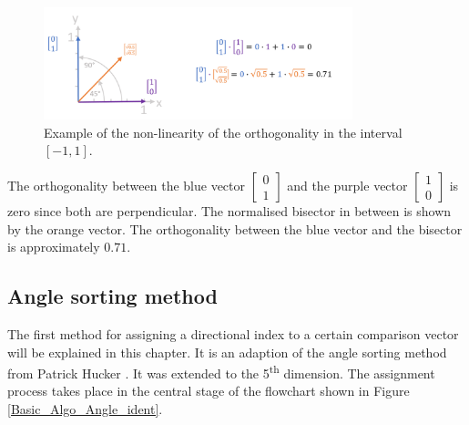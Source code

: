 \begin{figure}[H]
    \centering
    \includegraphics[width=0.8\textwidth]{Graphics/orthogonality2.png}
    \caption{Example of the non-linearity of the orthogonality in the interval $[-1,1]$. }
    \label{orthogonaltiy_figure2}
\end{figure}

The orthogonality between the blue vector $\begin{bmatrix} 0 \\ 1 \end{bmatrix}$ and the purple vector $\begin{bmatrix} 1 \\ 0 \end{bmatrix}$ is zero since both are perpendicular. The normalised bisector in between is shown by the orange vector.
The orthogonality between the blue vector and the bisector is approximately $0.71$.





\subsection{Angle sorting method}
\label{chap:angle_sorting}
The first method for assigning a directional index to a certain comparison vector will be explained in this chapter. It is an adaption of the angle sorting method from Patrick Hucker \cite{PatrickHucker2014EvaluationRuckstreumodells}. It was extended to the 5\textsuperscript{th} dimension. The assignment process takes place in the central stage of the flowchart shown in Figure \ref{Basic_Algo_Angle_ident}. 




